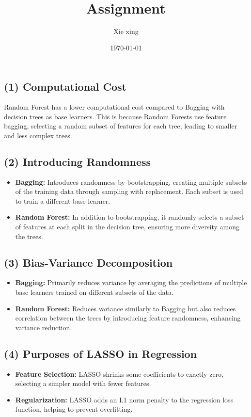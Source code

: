 \documentclass[oneside,solution]{seu-ml-assign}
\title{Assignment}
\author{Xie xing}
\date{\today}
\begin{document}
\maketitle



\subsection{(1) Computational Cost}

Random Forest has a lower computational cost compared to Bagging with decision trees as base learners. This is because Random Forests use feature bagging, selecting a random subset of features for each tree, leading to smaller and less complex trees.

\subsection{(2) Introducing Randomness}
\begin{itemize}
    \item \textbf{Bagging:} Introduces randomness by bootstrapping, creating multiple subsets of the training data through sampling with replacement. Each subset is used to train a different base learner.
    \item \textbf{Random Forest:} In addition to bootstrapping, it randomly selects a subset of features at each split in the decision tree, ensuring more diversity among the trees.
\end{itemize}

\subsection{(3) Bias-Variance Decomposition}
\begin{itemize}
    \item \textbf{Bagging:} Primarily reduces variance by averaging the predictions of multiple base learners trained on different subsets of the data.
    \item \textbf{Random Forest:} Reduces variance similarly to Bagging but also reduces correlation between the trees by introducing feature randomness, enhancing variance reduction.
\end{itemize}

\subsection{(4) Purposes of LASSO in Regression}
\begin{itemize}
    \item \textbf{Feature Selection:} LASSO shrinks some coefficients to exactly zero, selecting a simpler model with fewer features.
    \item \textbf{Regularization:} LASSO adds an L1 norm penalty to the regression loss function, helping to prevent overfitting.
\end{itemize}
\end{document}
